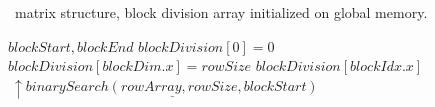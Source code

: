 \documentclass[conference]{IEEEtran}
\begin{document}
\begin{algorithm}[h]
\small
\caption{Preliminar kernel}
\algorithmicrequire~matrix structure, block division array initialized on global memory.
\begin{algorithmic}[1]
\State $blockStart,blockEnd$ 
\State $blockDivision[0]=0$
\State $blockDivision[blockDim.x]=rowSize$
\Else 
\State $blockDivision[blockIdx.x]$
\State $\ \uparrow \underline{binarySearch(rowArray,rowSize,blockStart)}$
\EndIf
\EndProcedure
\end{algorithmic}
\label{alg:blockDivisionKernel}
\end{algorithm}
\end{document}
